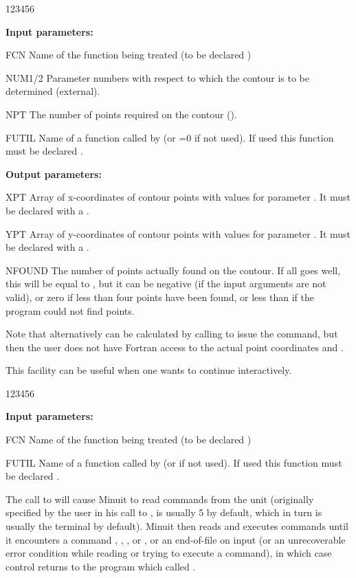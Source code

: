 \begin{DLtt}{123456}
\item[{\rm\bf Input parameters:}]
\item[FCN]    Name of the function being treated (to be declared )
\item[NUM1/2] Parameter numbers with respect to which the contour
              is to be determined (external).
\item[NPT]    The number of points required on the contour ().
\item[FUTIL]  Name of a function called by  (or =0 if not used).
              If used this function must be declared .
\item[{\rm\bf Output parameters:}]
\item[XPT]    Array of x-coordinates of contour points with 
              values for parameter .
              It must be declared with a .
\item[YPT]    Array of y-coordinates of contour points with
              values for parameter .
              It must be declared with a .
\item[NFOUND] The number of points actually found on the contour.
              If all goes well, this will be equal to , but it can be
              negative (if the input arguments are not valid), or zero if
              less than four points have been found, or less than  if the
              program could not find  points.
\end{DLtt}
 
Note that alternatively  can be calculated
by calling  to issue the  command,
but then the user does not have Fortran access to the actual
point coordinates  and .
 

This facility can be useful when one wants to continue interactively.

 
\begin{DLtt}{123456}
\item[{\rm\bf Input parameters:}]
\item[FCN]    Name of the function being treated (to be declared )
\item[FUTIL]  Name of a function called by  (or  if not used).
              If used this function must be declared .
\end{DLtt}
 
The call to  will cause Minuit to read commands from
the unit  (originally specified by the user in his call to ,
 is usually 5 by default,
which in turn is usually the terminal by default).
Minuit then reads and executes commands until it encounters
a command , , , or , 
or an end-of-file on input
(or an unrecoverable error condition while reading
or trying to execute a command), in which case control returns
to the program which called .
